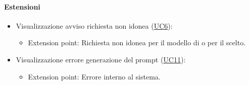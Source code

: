 \paragraph*{Estensioni}
\begin{itemize}
  \item Visualizzazione avviso richiesta non idonea (\hyperref[UC6]{UC6}):
  \begin{itemize}
    \item Extension point: Richiesta non idonea per il modello di  o per il  scelto.
  \end{itemize}
  \item Visualizzazione errore generazione del prompt (\hyperref[UC11]{UC11}):
    \begin{itemize}
      \item Extension point: Errore interno al sistema.
    \end{itemize}
\end{itemize}